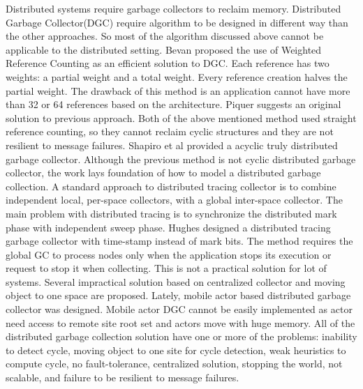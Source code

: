 Distributed systems require garbage collectors to reclaim memory. Distributed Garbage Collector(DGC) require algorithm to be designed in different way than the other approaches. So most of the algorithm discussed above cannot be applicable to the distributed setting. Bevan\cite{Bevan87} proposed the use of Weighted Reference Counting as an efficient solution to DGC. Each reference has two weights: a partial weight and a total weight. Every reference creation halves the partial weight. The drawback of this method is an application cannot have more than 32 or 64 references based on the architecture. Piquer\cite{piquer91} suggests an original solution to previous approach. Both of the above mentioned method used straight reference counting, so they cannot reclaim cyclic structures and they are not resilient to message failures. Shapiro et al \cite{Shapiro92} provided a acyclic truly distributed garbage collector. Although the previous method is not cyclic distributed garbage collector, the work lays foundation of how to model a  distributed garbage collection. A standard approach to distributed tracing collector is to combine independent local, per-space collectors, with a global inter-space collector. The main problem with distributed tracing is to synchronize the distributed mark phase with independent sweep phase\cite{plain95}. Hughes designed a distributed tracing garbage collector with  time-stamp instead of mark bits\cite{hugh85}. The method requires the global GC to process nodes only when the application stops its execution or request to stop it when collecting. This is not a practical solution for lot of systems. Several impractical solution based on centralized collector and moving object to one space are proposed\cite{Maheshwari1997,Maheshwari1997b,Liskov,ladin,Veiga05}. Lately, mobile actor based distributed garbage collector was designed\cite{want}. Mobile actor DGC cannot be easily implemented as actor need access to remote site root set and actors move with huge memory.  All of the distributed garbage collection solution have one or more of the problems: inability to detect cycle, moving object to one site for cycle detection, weak heuristics to compute cycle, no fault-tolerance, centralized solution, stopping the world, not scalable, and failure to be resilient to message failures.
